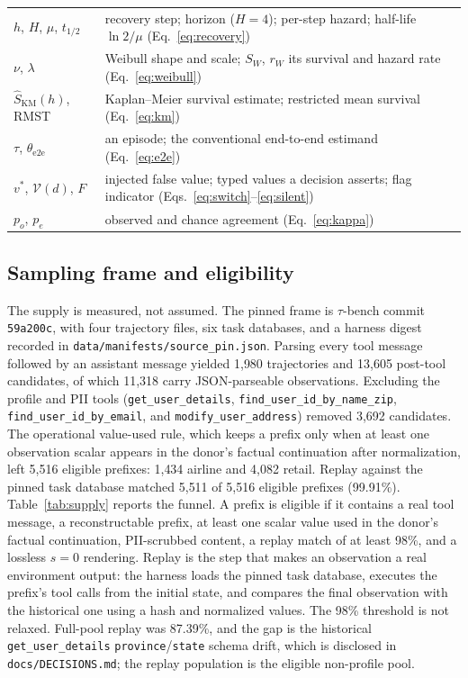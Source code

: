 \documentclass[a4paper,fleqn]{cas-sc}
\begin{document}
\begin{table}[pos=htbp]
\begin{tabular}{>{\raggedright\arraybackslash}p{2.1cm}>{\raggedright\arraybackslash}p{11.6cm}}
    $h$, $H$, $\mu$, $t_{1/2}$ & recovery step; horizon ($H=4$); per-step hazard; half-life $\ln2/\mu$ (Eq.~\ref{eq:recovery}) \\
    $\nu$, $\lambda$ & Weibull shape and scale; $S_W$, $r_W$ its survival and hazard rate (Eq.~\ref{eq:weibull}) \\
    $\hat S_{\mathrm{KM}}(h)$, RMST & Kaplan--Meier survival estimate; restricted mean survival (Eq.~\ref{eq:km}) \\
    $\tau$, $\theta_{\mathrm{e2e}}$ & an episode; the conventional end-to-end estimand (Eq.~\ref{eq:e2e}) \\
    $v^{\ast}$, $\mathcal{V}(d)$, $F$ & injected false value; typed values a decision asserts; flag indicator (Eqs.~\ref{eq:switch}--\ref{eq:silent}) \\
    $p_o$, $p_e$ & observed and chance agreement (Eq.~\ref{eq:kappa}) \\
    \bottomrule
  \end{tabular}
\end{table}

\subsection{Sampling frame and eligibility}

\label{sec:supply}

The supply is measured, not assumed. The pinned frame is $\tau$-bench commit \texttt{59a200c},
with four trajectory files, six task databases, and a harness digest recorded in
\texttt{data/manifests/source\_pin.json}. Parsing every tool message followed by an assistant
message yielded 1{,}980 trajectories and 13{,}605 post-tool candidates, of which 11{,}318 carry
JSON-parseable observations. Excluding the profile and PII tools
(\texttt{get\_user\_details}, \texttt{find\_user\_id\_by\_name\_zip},
\texttt{find\_user\_id\_by\_email}, and \texttt{modify\_user\_address}) removed 3{,}692
candidates. The operational value-used rule, which keeps a prefix only when at least one
observation scalar appears in the donor's factual continuation after normalization, left
5{,}516 eligible prefixes: 1{,}434 airline and 4{,}082 retail. Replay against the pinned task
database matched 5{,}511 of 5{,}516 eligible prefixes (99.91\%). Table~\ref{tab:supply} reports
the funnel. A prefix is eligible if it contains a real tool message, a reconstructable prefix, at least one
scalar value used in the donor's factual continuation, PII-scrubbed content, a replay match of at
least 98\%, and a lossless $s=0$ rendering. Replay is the step that makes an observation a real
environment output: the harness loads the pinned task database, executes the prefix's tool calls
from the initial state, and compares the final observation with the historical one using a hash
and normalized values. The 98\% threshold is not relaxed. Full-pool replay was 87.39\%, and the
gap is the historical \texttt{get\_user\_details} \texttt{province}/\texttt{state} schema drift,
which is disclosed in \texttt{docs/DECISIONS.md}; the replay population is the eligible
non-profile pool.
\end{document}
